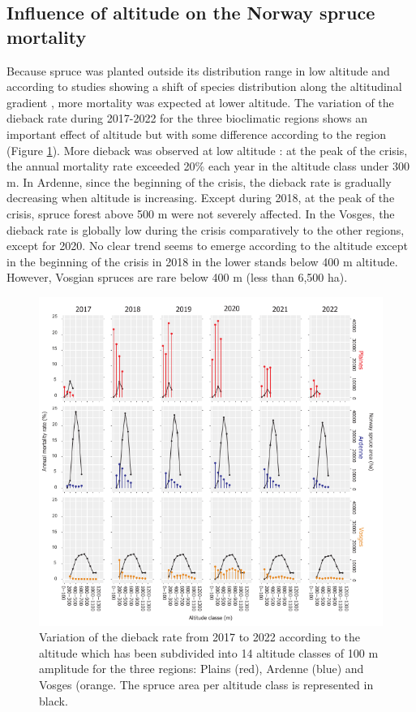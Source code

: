 \documentclass[3p,procedia]{elsarticle}
\begin{document}
\subsection{ Influence of altitude on the Norway spruce mortality}
Because spruce was planted outside its distribution range in low altitude and according to studies showing a shift of species distribution along the altitudinal gradient \citep{lenoir_significant_2008}, more mortality was expected at lower altitude. 
The variation of the dieback rate during 2017-2022  for the three bioclimatic regions shows an important effect of altitude but with some difference according to the region (Figure \ref{alti_sco}).
More dieback was observed at low altitude : at the peak of the crisis, the annual mortality rate exceeded 20\% each year in the altitude class under 300 m.
In Ardenne, since the beginning of the crisis, the dieback rate is gradually decreasing when altitude is increasing.
Except during 2018, at the peak of the crisis, spruce forest above 500 m were not severely affected.
In the Vosges, the dieback rate is globally low during the crisis comparatively to the other regions, except for 2020.
No clear trend seems to emerge according to the altitude except in the beginning of the crisis in 2018 in the lower stands below 400 m altitude.
However, Vosgian spruces are rare below 400 m (less than 6,500 ha).
\begin{figure}[htbp] 
\centering
	\includegraphics[width=\textwidth]{synthese_color_11_2022.png}
     \caption{Variation of the dieback rate from 2017 to 2022 according to the altitude which has been subdivided into 14 altitude classes of 100 m amplitude for the three regions: Plains (red), Ardenne (blue) and Vosges (orange. The spruce area per altitude class is represented in black.  
}
	\label{alti_sco}
\end{figure}
\end{document}
